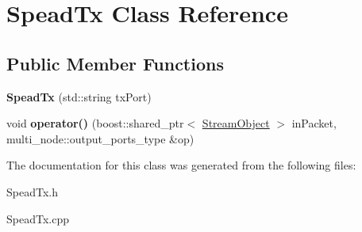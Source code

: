 \hypertarget{class_spead_tx}{}\section{Spead\+Tx Class Reference}
\label{class_spead_tx}
\subsection*{Public Member Functions}
\begin{DoxyCompactItemize}
\item 
{\bfseries Spead\+Tx} (std\+::string tx\+Port)\hypertarget{class_spead_tx_ac7d0511ee60d12a49c09b4b433805c18}{}\label{class_spead_tx_ac7d0511ee60d12a49c09b4b433805c18}

\item 
void {\bfseries operator()} (boost\+::shared\+\_\+ptr$<$ \hyperlink{class_stream_object}{Stream\+Object} $>$ in\+Packet, multi\+\_\+node\+::output\+\_\+ports\+\_\+type \&op)\hypertarget{class_spead_tx_aff4c65ab3eac81fb0431e8d3182feaaa}{}\label{class_spead_tx_aff4c65ab3eac81fb0431e8d3182feaaa}

\end{DoxyCompactItemize}


The documentation for this class was generated from the following files\+:\begin{DoxyCompactItemize}
\item 
Spead\+Tx.\+h\item 
Spead\+Tx.\+cpp\end{DoxyCompactItemize}
